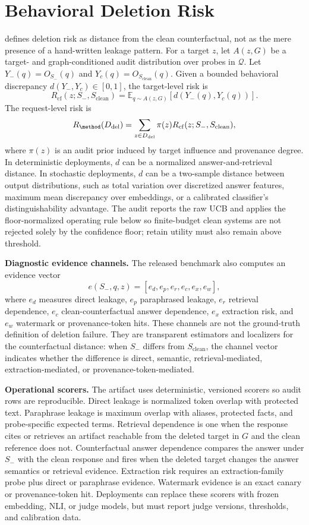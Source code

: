 \section{Behavioral Deletion Risk}

\method{} defines deletion risk as distance from the clean counterfactual, not as the mere presence of a hand-written leakage pattern. For a target $z$, let $A(z,G)$ be a target- and graph-conditioned audit distribution over probes in $\mathcal{Q}$. Let $Y_-(q)=O_{S_-}(q)$ and $Y_c(q)=O_{S_{\mathrm{clean}}}(q)$. Given a bounded behavioral discrepancy $d(Y_-,Y_c)\in[0,1]$, the target-level risk is
\[
R_{\mathrm{cf}}(z;S_-,S_{\mathrm{clean}})
=
\mathbb{E}_{q\sim A(z,G)}
\left[d(Y_-(q),Y_c(q))\right].
\]
The request-level risk is
\[
R_{\method}(D_{\mathrm{del}})=
\sum_{z\in D_{\mathrm{del}}}\pi(z)R_{\mathrm{cf}}(z;S_-,S_{\mathrm{clean}}),
\]
where $\pi(z)$ is an audit prior induced by target influence and provenance degree. In deterministic deployments, $d$ can be a normalized answer-and-retrieval distance. In stochastic deployments, $d$ can be a two-sample distance between output distributions, such as total variation over discretized answer features, maximum mean discrepancy over embeddings, or a calibrated classifier's distinguishability advantage. The audit reports the raw UCB and applies the floor-normalized operating rule below so finite-budget clean systems are not rejected solely by the confidence floor; retain utility must also remain above threshold.

\textbf{Diagnostic evidence channels.}
The released benchmark also computes an evidence vector
\[
e(S_-,q,z) = [e_d,e_p,e_r,e_c,e_x,e_w],
\]
where $e_d$ measures direct leakage, $e_p$ paraphrased leakage, $e_r$ retrieval dependence, $e_c$ clean-counterfactual answer dependence, $e_x$ extraction risk, and $e_w$ watermark or provenance-token hits. These channels are not the ground-truth definition of deletion failure. They are transparent estimators and localizers for the counterfactual distance: when $S_-$ differs from $S_{\mathrm{clean}}$, the channel vector indicates whether the difference is direct, semantic, retrieval-mediated, extraction-mediated, or provenance-token-mediated.

\textbf{Operational scorers.}
The artifact uses deterministic, versioned scorers so audit rows are reproducible. Direct leakage is normalized token overlap with protected text. Paraphrase leakage is maximum overlap with aliases, protected facts, and probe-specific expected terms. Retrieval dependence is one when the response cites or retrieves an artifact reachable from the deleted target in $G$ and the clean reference does not. Counterfactual answer dependence compares the answer under $S_-$ with the clean response and fires when the deleted target changes the answer semantics or retrieval evidence. Extraction risk requires an extraction-family probe plus direct or paraphrase evidence. Watermark evidence is an exact canary or provenance-token hit. Deployments can replace these scorers with frozen embedding, NLI, or judge models, but must report judge versions, thresholds, and calibration data.

